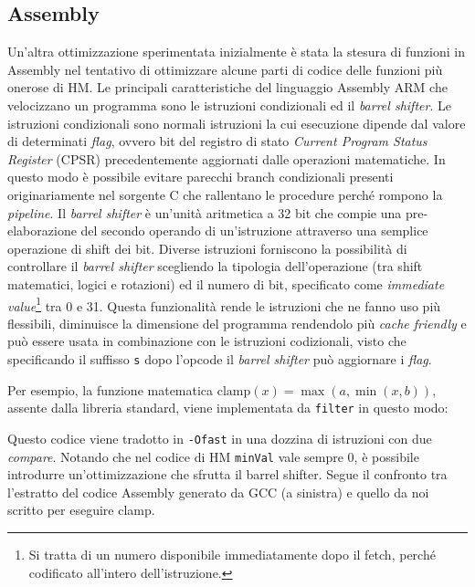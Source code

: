 \subsection{Assembly}
Un'altra ottimizzazione sperimentata inizialmente è stata la stesura di 
funzioni in Assembly nel tentativo di ottimizzare alcune parti di codice delle 
funzioni più onerose di HM.
Le principali caratteristiche del linguaggio Assembly ARM che velocizzano un 
programma sono le istruzioni condizionali ed il \emph{barrel shifter}. \newline
Le istruzioni condizionali sono normali istruzioni la cui esecuzione dipende
dal valore di determinati \emph{flag}, ovvero bit del registro di stato 
\emph{Current Program Status Register} (CPSR) precedentemente aggiornati dalle 
operazioni matematiche. In questo modo è possibile evitare 
parecchi branch condizionali presenti originariamente nel sorgente C che 
rallentano le 
procedure perché rompono la \emph{pipeline}.\newline
Il \emph{barrel shifter} è un'unità aritmetica a 32 bit che compie una 
pre-elaborazione del secondo operando di un'istruzione attraverso una semplice 
operazione di shift dei bit. Diverse istruzioni forniscono la possibilità di 
controllare il \emph{barrel shifter} scegliendo la tipologia dell'operazione 
(tra shift matematici, logici e rotazioni) ed il numero di bit, specificato 
come \emph{immediate value}\footnote{Si tratta di un numero 
disponibile immediatamente dopo il fetch, perché codificato 
all'intero dell'istruzione.} tra 0 e 31. Questa funzionalità rende le 
istruzioni che ne fanno uso più flessibili, diminuisce la dimensione del 
programma rendendolo più \emph{cache friendly} e può essere usata in 
combinazione con le istruzioni codizionali, visto che specificando il suffisso 
\verb|s| dopo l'opcode il \emph{barrel shifter} può aggiornare i \emph{flag}.
\par Per esempio, la funzione matematica $\text{clamp}(x) = 
\max(a,\min(x,b))$, assente dalla libreria standard, viene implementata da 
\verb+filter+ in questo modo: \\
\lstset{style=cstyle}


Questo codice viene tradotto in \verb|-Ofast| in una dozzina di istruzioni con 
due \emph{compare}. Notando che nel codice di HM \verb|minVal| vale sempre 0, è 
possibile introdurre un'ottimizzazione che sfrutta il barrel shifter. \newline
Segue il confronto tra l'estratto del codice Assembly generato da GCC (a 
sinistra) e quello da noi scritto per eseguire clamp.\\

